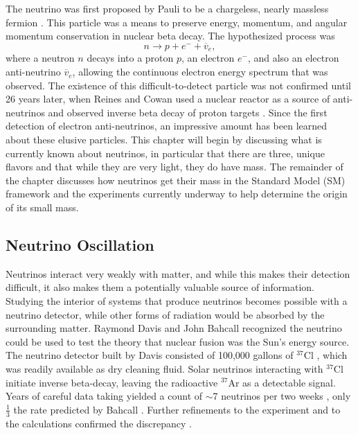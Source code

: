 The neutrino was first proposed by Pauli to be a chargeless, nearly massless fermion \citep{Pauli}.  This particle was a means to preserve energy, momentum, and angular momentum conservation in nuclear beta decay.  The hypothesized process was
\begin{equation}
n \rightarrow p + e^- + \overline{v}_e,
\end{equation}
where a neutron $n$ decays into a proton $p$, an electron $e^-$, and also an electron anti-neutrino $\overline{v}_e$, allowing the continuous electron energy spectrum that was observed. The existence of this difficult-to-detect particle was not confirmed until 26 years later, when Reines and Cowan used a nuclear reactor as a source of anti-neutrinos and observed inverse beta decay of proton targets \citep{poltergeist}.  Since the first detection of electron anti-neutrinos, an impressive amount has been learned about these elusive particles.  This chapter will begin by discussing what is currently known about neutrinos, in particular that there are three, unique flavors and that while they are very light, they do have mass.  The remainder of the chapter discusses how neutrinos get their mass in the Standard Model (SM) framework and the experiments currently underway to help determine the origin of its small mass.

\subsection{Neutrino Oscillation}
Neutrinos interact very weakly with matter, and while this makes their detection difficult, it also makes them a potentially valuable source of information.  Studying the interior of systems that produce neutrinos becomes possible with a neutrino detector, while other forms of radiation would be absorbed by the surrounding matter.  Raymond Davis and John Bahcall recognized the neutrino could be used to test the theory that nuclear fusion was the Sun's energy source.  The neutrino detector built by Davis consisted of 100,000 gallons of $^{37}$Cl \citep{DavisInitial}, which was readily available as dry cleaning fluid.  Solar neutrinos interacting with $^{37}$Cl initiate inverse beta-decay, leaving the radioactive $^{37}$Ar as a detectable signal.  Years of careful data taking yielded a count of $\sim$7 neutrinos per two weeks \citep{DavisInitial}, only $\frac{1}{3}$ the rate predicted by Bahcall \citep{BahcallSun}.  Further refinements to the experiment and to the calculations confirmed the discrepancy \citep{Davis}.

